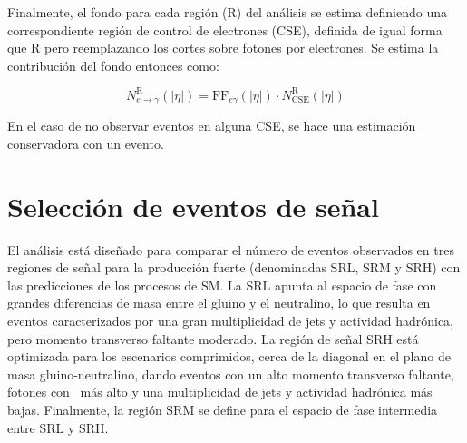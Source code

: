 \begin{table}
\centering
\caption{Factores de reconstrucción errónea de electrones como fotones en función de $|\eta|$ para todos los datos del Run 2. Se ponen explícitas las incertidumbres estadísticas y sistemáticas provenientes de variar la ventana de integración, no emplear la sustracción de fondo y el sesgo en la energía de los fotones.}
\label{tab:efakes_ff}
\end{table}


Finalmente, el fondo para cada región (R) del análisis se estima definiendo una correspondiente región de control de electrones (CSE), definida de igual forma que R pero reemplazando los cortes sobre fotones por electrones. Se estima la contribución del fondo entonces como:

\begin{equation}
  N^{\text{R}}_{e\rightarrow\gamma}(|\eta|) = \text{FF}_{e\gamma}(|\eta|)\cdot N^{\text{R}}_{\mathrm{CSE}}(|\eta|)
\end{equation}

En el caso de no observar eventos en alguna CSE, se hace una estimación conservadora con un evento.


\section{Selección de eventos de señal}

El análisis está diseñado para comparar el número de eventos observados en tres regiones de señal para la producción fuerte (denominadas SRL, SRM y SRH) con las predicciones de los procesos de SM.
La SRL apunta al espacio de fase con grandes diferencias de masa entre el gluino y el neutralino, lo que resulta en eventos caracterizados por una gran multiplicidad de jets y actividad hadrónica, pero momento transverso faltante moderado. La región de señal SRH está optimizada para los escenarios comprimidos, cerca de la diagonal en el plano de masa gluino-neutralino, dando eventos con un alto momento transverso faltante, fotones con \pt\ más alto y una multiplicidad de jets y actividad hadrónica más bajas. Finalmente, la región SRM se define para el espacio de fase intermedia entre SRL y SRH.

